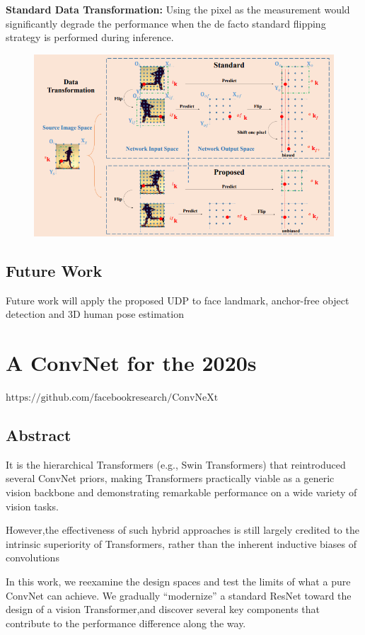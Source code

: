 \documentclass[11pt]{article}
\begin{document}
\noindent \textbf{Standard Data Transformation:}
Using the pixel as the measurement would significantly degrade the performance when the
de facto standard flipping strategy is performed during inference.

\begin{figure}[H]
	\centering
	\includegraphics[scale=0.5]{40}
\end{figure}
\subsection{Future Work}
Future work will apply the proposed UDP to face landmark, anchor-free object detection and 3D human pose estimation
\section{A ConvNet for the 2020s}
$\text{https://github.com/facebookresearch/ConvNeXt}$
\subsection{Abstract}
It is the hierarchical
Transformers (e.g., Swin Transformers) that reintroduced several ConvNet priors, making Transformers practically viable as a generic vision backbone and demonstrating remarkable performance on a wide variety of vision tasks.

However,the effectiveness of such hybrid approaches is still largely credited to the intrinsic superiority of Transformers, rather than the inherent inductive biases of convolutions

In this work, we reexamine the design spaces and test the limits of what a pure ConvNet can achieve. We gradually “modernize” a standard ResNet toward the design of a vision Transformer,and discover several key components that contribute to the performance difference along the way.
\end{document}
